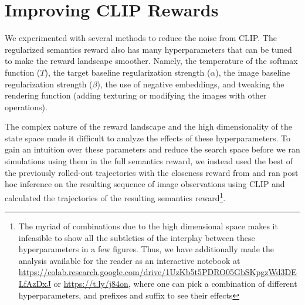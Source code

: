 






\newpage
\section{Improving CLIP Rewards}
\label{sec:improving-rewards}

We experimented with several methods to reduce the noise from CLIP.
The regularized semantics reward also has many hyperparameters that can be tuned to make the reward landscape smoother.
Namely, the temperature of the softmax function (\(T\)), the target baseline regularization strength (\(\alpha\)), the image baseline regularization strength (\(\beta\)), the use of negative embeddings, and tweaking the rendering function (adding texturing or modifying the images with other operations).

The complex nature of the reward landscape and the high dimensionality of the state space made it difficult to analyze the effects of these hyperparameters.
To gain an intuition over these parameters and reduce the search space before we ran simulations using them in the full semantics reward, we instead used the best of the previously rolled-out trajectories with the closeness reward from  and ran post hoc inference on the resulting sequence of image observations using CLIP and calculated the trajectories of the resulting semantics reward\footnote{The myriad of combinations due to the high dimensional space makes it infeasible to show all the subtleties of the interplay between these hyperparameters in a few figures.
Thus, we have additionally made the analysis available for the reader as an interactive notebook at \url{https://colab.research.google.com/drive/1UzKb5t5PDRO05GbSKpgzWd3DELfAzDxJ} or \url{https://t.ly/j84on}, where one can pick a combination of different hyperparameters, and prefixes and suffix to see their effects}.

